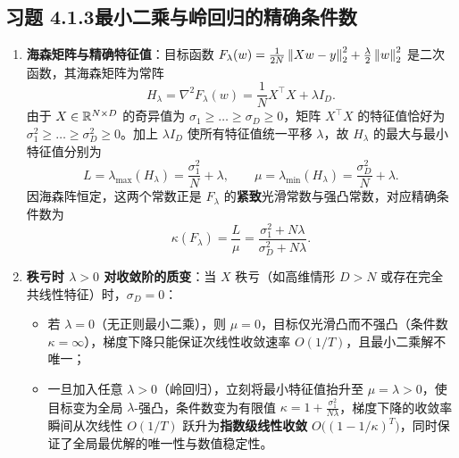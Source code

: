 \subsection*{习题 4.1.3\quad 最小二乘与岭回归的精确条件数}
\begin{enumerate}[label=(\arabic*), leftmargin=1.8em]
  \item \textbf{海森矩阵与精确特征值}：目标函数 $F_\lambda(w) = \frac{1}{2N}\left\|Xw - y\right\|_2^2 + \frac{\lambda}{2}\left\|w\right\|_2^2$ 是二次函数，其海森矩阵为常阵
  \[
    H_\lambda = \nabla^2 F_\lambda(w) = \frac{1}{N}X^\top X + \lambda I_D.
  \]
  由于 $X \in \mathbb{R}^{N\times D}$ 的奇异值为 $\sigma_1 \ge \dots \ge \sigma_D \ge 0$，矩阵 $X^\top X$ 的特征值恰好为 $\sigma_1^2 \ge \dots \ge \sigma_D^2 \ge 0$。加上 $\lambda I_D$ 使所有特征值统一平移 $\lambda$，故 $H_\lambda$ 的最大与最小特征值分别为
  \[
    L = \lambda_{\max}(H_\lambda) = \frac{\sigma_1^2}{N} + \lambda, \qquad
    \mu = \lambda_{\min}(H_\lambda) = \frac{\sigma_D^2}{N} + \lambda.
  \]
  因海森阵恒定，这两个常数正是 $F_\lambda$ 的\textbf{紧致}光滑常数与强凸常数，对应精确条件数为
  \[
    \kappa(F_\lambda) = \frac{L}{\mu} = \frac{\sigma_1^2 + N\lambda}{\sigma_D^2 + N\lambda}.
  \]

  \item \textbf{秩亏时 $\lambda > 0$ 对收敛阶的质变}：当 $X$ 秩亏（如高维情形 $D > N$ 或存在完全共线性特征）时，$\sigma_D = 0$：
  \begin{itemize}
    \item 若 $\lambda = 0$（无正则最小二乘），则 $\mu = 0$，目标仅光滑凸而不强凸（条件数 $\kappa = \infty$），梯度下降只能保证次线性收敛速率 $O(1/T)$，且最小二乘解不唯一；
    \item 一旦加入任意 $\lambda > 0$（岭回归），立刻将最小特征值抬升至 $\mu = \lambda > 0$，使目标变为全局 $\lambda$-强凸，条件数变为有限值 $\kappa = 1 + \frac{\sigma_1^2}{N\lambda}$，梯度下降的收敛率瞬间从次线性 $O(1/T)$ 跃升为\textbf{指数级线性收敛} $O\!\big((1 - 1/\kappa)^T\big)$，同时保证了全局最优解的唯一性与数值稳定性。
  \end{itemize}
\end{enumerate}


